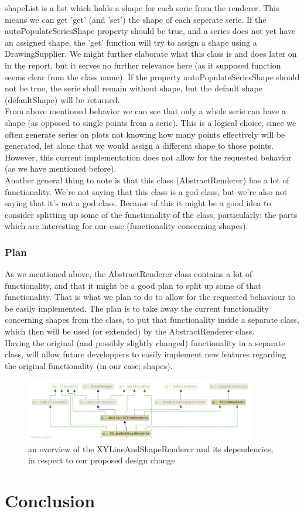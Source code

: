 \documentclass{article}
\begin{document}
shapeList is a list which holds a shape for each serie from the renderer.
This means we can get 'get' (and 'set') the shape of each seperate serie. If the autoPopulateSeriesShape property should be true, and a series does not yet have an assigned shape, the 'get' function will try to assign a shape using a DrawingSupplier. We might further elaborate what this class is and does later on in the report, but it serves no further relevance here (as it supposed function seems clear from the class name). If the property autoPopulateSeriesShape should not be true, the serie shall remain without shape, but the default shape (defaultShape) will be returned.\\ 

From above mentioned behavior we can see that only a whole serie can have a shape (as opposed to single points from a serie). This is a logical choice, since we often generate series on plots not knowing how many points effectively will be generated, let alone that we would assign a different shape to those points. However, this current implementation does not allow for the requested behavior (as we have mentioned before).\\

Another general thing to note is that this class (AbstractRenderer) has a lot of functionality. We're not saying that this class is a god class, but we're also not saying that it's not a god class. Because of this it might be a good idea to consider splitting up some of the functionality of the class, particularly: the parts which are interesting for our case (functionality concerning shapes).

\subsubsection{Plan}

As we mentioned above, the AbstractRenderer class contains a lot of functionality, and that it might be a good plan to split up some of that functionality. That is what we plan to do to allow for the requested behaviour to be easily implemented. The plan is to take away the current functionality concerning shapes from the class, to put that functionality inside a separate class, which then will be used (or extended) by the AbstractRenderer class.\\ 

Having the original (and possibly slightly changed) functionality in a separate class, will allow future developpers to easily implement new features regarding the original functionality (in our case; shapes).

\begin{figure}[H]
\centering
	\includegraphics[width=0.9\textwidth]{RefactorStage1Design.png}
	\caption{an overview of the XYLineAndShapeRenderer and its dependencies, in respect to our proposed design change}
\end{figure}

\newpage
\section{Conclusion}
\end{document}
